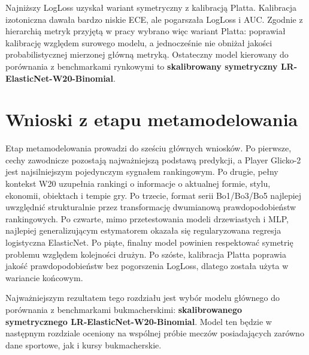 Najniższy LogLoss uzyskał wariant symetryczny z kalibracją Platta. Kalibracja izotoniczna dawała
bardzo niskie ECE, ale pogarszała LogLoss i AUC. Zgodnie z hierarchią metryk przyjętą w pracy
wybrano więc wariant Platta: poprawiał kalibrację względem surowego modelu, a jednocześnie nie
obniżał jakości probabilistycznej mierzonej główną metryką. Ostateczny model kierowany do porównania
z benchmarkami rynkowymi to \textbf{skalibrowany symetryczny LR-ElasticNet-W20-Binomial}.

\section{Wnioski z etapu metamodelowania}

Etap metamodelowania prowadzi do sześciu głównych wniosków. Po pierwsze, cechy zawodnicze pozostają
najważniejszą podstawą predykcji, a Player Glicko-2 jest najsilniejszym pojedynczym sygnałem
rankingowym. Po drugie, pełny kontekst W20 uzupełnia rankingi o informacje o aktualnej formie,
stylu, ekonomii, obiektach i tempie gry. Po trzecie, format serii Bo1/Bo3/Bo5 najlepiej uwzględnić
strukturalnie przez transformację dwumianową prawdopodobieństw rankingowych. Po czwarte, mimo
przetestowania modeli drzewiastych i MLP, najlepiej generalizującym estymatorem okazała się
regularyzowana regresja logistyczna ElasticNet. Po piąte, finalny model powinien respektować
symetrię problemu względem kolejności drużyn. Po szóste, kalibracja Platta poprawia jakość
prawdopodobieństw bez pogorszenia LogLoss, dlatego została użyta w wariancie końcowym.

Najważniejszym rezultatem tego rozdziału jest wybór modelu głównego do porównania z benchmarkami
bukmacherskimi: \textbf{skalibrowanego symetrycznego LR-ElasticNet-W20-Binomial}. Model ten będzie w
następnym rozdziale oceniony na wspólnej próbie meczów posiadających zarówno dane sportowe, jak i
kursy bukmacherskie.
